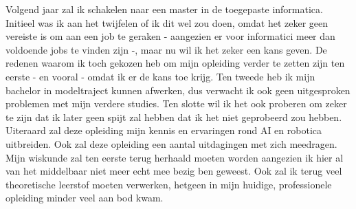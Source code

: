 Volgend jaar zal ik schakelen naar een master in de toegepaste informatica. Initieel was ik aan het twijfelen of ik dit wel zou doen, omdat het zeker geen vereiste is om aan een job te geraken - aangezien er voor informatici meer dan voldoende jobs te vinden zijn -, maar nu wil ik het zeker een kans geven. De redenen waarom ik toch gekozen heb om mijn opleiding verder te zetten zijn ten eerste - en vooral - omdat ik er de kans toe krijg. Ten tweede heb ik mijn bachelor in modeltraject kunnen afwerken, dus verwacht ik ook geen uitgesproken problemen met mijn verdere studies. Ten slotte wil ik het ook proberen om zeker te zijn dat ik later geen spijt zal hebben dat ik het niet geprobeerd zou hebben. Uiteraard zal deze opleiding mijn kennis en ervaringen rond AI en robotica uitbreiden. Ook zal deze opleiding een aantal uitdagingen met zich meedragen. Mijn wiskunde zal ten eerste terug herhaald moeten worden aangezien ik hier al van het middelbaar niet meer echt mee bezig ben geweest. Ook zal ik terug veel theoretische leerstof moeten verwerken, hetgeen in mijn huidige, professionele opleiding minder veel aan bod kwam.